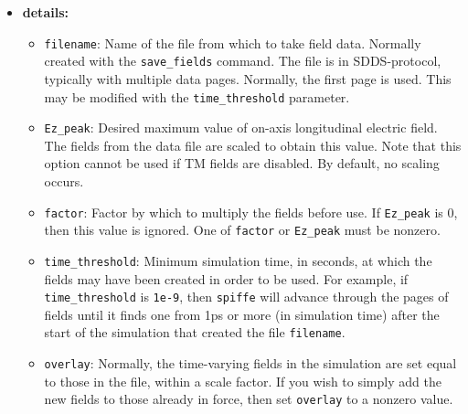 \begin{itemize}
\item {\bf details:}
\begin{itemize}
\item {\tt filename}: Name of the file from which to take field
        data.  Normally created with the {\tt save\_fields} command.
        The file is in SDDS-protocol, typically with multiple data pages.
        Normally, the first page is used.  This may be modified with
        the {\tt time\_threshold} parameter.
\item {\tt Ez\_peak}: Desired maximum value of on-axis longitudinal electric
        field.  The fields from the data file are scaled to obtain this value.
        Note that this option cannot be used if TM fields are disabled.
        By default, no scaling occurs.
\item {\tt factor}: Factor by which to multiply the fields before use.
        If {\tt Ez\_peak} is 0, then this value is ignored.  One of
        {\tt factor} or {\tt Ez\_peak} must be nonzero.
\item {\tt time\_threshold}: Minimum simulation time, in seconds, at which
        the fields may have been created in order to be used.  For example,
        if {\tt time\_threshold} is {\tt 1e-9}, then {\tt spiffe} will advance
        through the pages of fields until it finds one from 1ps or more
        (in simulation time) after the start of the simulation that created
        the file {\tt filename}.
\item {\tt overlay}: Normally, the time-varying fields in the simulation are
        set equal to those in the file, within a scale factor.  If you wish to
        simply add the new fields to those already in force, then set {\tt overlay}
        to a nonzero value.
\end{itemize}

\end{itemize}
